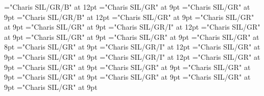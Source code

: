 \documentclass[gps1,twoside]{article}
\begin{document}
\font\nontrivialentryrootnontrivialentryrootsvisiblecomplexformbackrefvisiblecomplexformbackrefssensesensessubentrysubentriesentry="Charis SIL/GR/B" at 12pt
\font\spanspansensecontentspansensessensesensessubentrysubentriesentrybefore="Charis SIL/GR" at 9pt
\font\sensessensesensessubentrysubentriesentryafter="Charis SIL/GR" at 9pt
\font\sensenumbersensecontentsensessensesensessubentrysubentriesentry="Charis SIL/GR/B" at 12pt
\font\sensenumbersensecontentsensessensesensessubentrysubentriesentryafter="Charis SIL/GR" at 9pt
\font\sensetypesensesensessensesensessubentrysubentriesentrybefore="Charis SIL/GR" at 9pt
\font\sensetypesensesensessensesensessubentrysubentriesentryafter="Charis SIL/GR" at 9pt
\font\sensetypesensesensessensesensessubentrysubentriesentry="Charis SIL/GR/I" at 12pt
\font\spanspanabbreviationsensetypesensesensessensesensessubentrysubentriesentrybefore="Charis SIL/GR" at 9pt
\font\spanspandefinitionorglosssensesensessensesensessubentrysubentriesentrybefore="Charis SIL/GR" at 9pt
\font\spandefinitionorglosssensesensessensesensessubentrysubentriesentrylastchildafter="Charis SIL/GR" at 9pt
\font\exampleexampleexamplessensesensessensesensessubentrysubentriesentrybefore="Charis SIL/GR" at 8pt
\font\examplessensesensessensesensessubentrysubentriesentryafter="Charis SIL/GR" at 9pt
\font\spanbzhexampleexampleexamplessensesensessensesensessubentrysubentriesentry="Charis SIL/GR/I" at 12pt
\font\spanspanexampleexampleexamplessensesensessensesensessubentrysubentriesentrybefore="Charis SIL/GR" at 9pt
\font\spanexampleexampleexamplessensesensessensesensessubentrysubentriesentrylastchildafter="Charis SIL/GR" at 9pt
\font\spanexampleexampleexamplessensesensessensesensessubentrysubentriesentry="Charis SIL/GR/I" at 12pt
\font\spanspantranslationtranslationtranslationsexampleexamplessensesensessensesensessubentrysubentriesentrybefore="Charis SIL/GR" at 9pt
\font\spantranslationtranslationtranslationsexampleexamplessensesensessensesensessubentrysubentriesentrylastchildafter="Charis SIL/GR" at 9pt
\font\spanspanencyclopedicinfosensesensessensesensessubentrysubentriesentrybefore="Charis SIL/GR" at 9pt
\font\spanencyclopedicinfosensesensessensesensessubentrysubentriesentryfirstchildbefore="Charis SIL/GR" at 9pt
\font\spanencyclopedicinfosensesensessensesensessubentrysubentriesentrylastchildafter="Charis SIL/GR" at 9pt
\font\spanspanrestrictionssensesensessensesensessubentrysubentriesentrybefore="Charis SIL/GR" at 9pt
\font\spanrestrictionssensesensessensesensessubentrysubentriesentryfirstchildbefore="Charis SIL/GR" at 9pt
\font\spanrestrictionssensesensessensesensessubentrysubentriesentrylastchildafter="Charis SIL/GR" at 9pt
\end{document}
